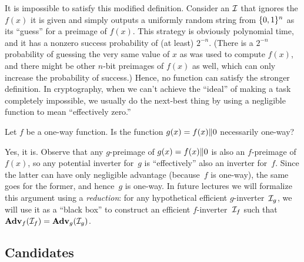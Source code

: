 \documentclass[11pt]{article}
\begin{document}
\begin{answer}
  It is impossible to satisfy this modified definition. Consider an
  \(\mathcal{I}\) that ignores the \(f(x)\) it is given and simply outputs a
  uniformly random string from \(\{0,1\}^n\) as its ``guess'' for a
  preimage of \(f(x)\). This strategy is obviously polynomial time,
  and it has a nonzero success probability of (at least)
  \(2^{-n}\). (There is a \(2^{-n}\) probability of guessing the very
  same value of \(x\) as was used to compute \(f(x)\), and there might
  be other $n$-bit preimages of \(f(x)\) as well, which can only
  increase the probability of success.) Hence, no function can satisfy
  the stronger definition. In cryptography, when we can't achieve the
  ``ideal'' of making a task completely impossible, we usually do the
  next-best thing by using a negligible function to mean ``effectively
  zero.''
\end{answer}

\begin{question}
  Let \(f\) be a one-way function. Is the function
  \(g(x) = f(x) \| 0\) necessarily one-way?
\end{question}

\begin{answer}
  Yes, it is. Observe that any $g$-preimage of $g(x) = f(x) \| 0$
  is also an $f$-preimage of $f(x)$, so any potential inverter for~$g$
  is ``effectively'' also an inverter for~$f$. Since the latter can
  have only negligible advantage (because~$f$ is one-way), the same
  goes for the former, and hence~$g$ is one-way. In future lectures we
  will formalize this argument using a \emph{reduction}: for any
  hypothetical efficient $g$-inverter~$\mathcal{I}_{g}$, we will use it as a
  ``black box'' to construct an efficient $f$-inverter~$\mathcal{I}_{f}$ such
  that $\mathbf{Adv}_{f}(\mathcal{I}_{f}) = \mathbf{Adv}_{g}(\mathcal{I}_{g})$.
\end{answer}

\subsection{Candidates}
\label{sec:candidates}
\end{document}
